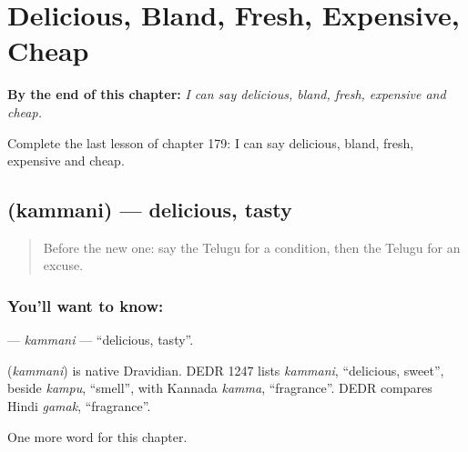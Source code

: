 
\chapter{Delicious, Bland, Fresh, Expensive, Cheap}
\label{ch:te-delicious-bland-fresh-expensive-cheap}

\begin{chapteropening}
\textbf{By the end of this chapter:} \emph{I can say delicious, bland, fresh, expensive and cheap.}

Complete the last lesson of chapter 179: I can say delicious, bland, fresh, expensive and cheap.
\end{chapteropening}

\section[\texorpdfstring{\te{కమ్మని} (kammani)}{కమ్మని (kammani)}]{ (kammani) — delicious, tasty}

\label{lesson:TE-C179-kammani}



\begin{quote}
Before the new one: say the Telugu for a condition, then the Telugu for an excuse.
\end{quote}

\subsection*{You'll want to know: }
\textbf{} — \emph{kammani} — \textquotedblleft{}delicious, tasty\textquotedblright{}.

\begin{cousinweb}
\textbf{} (\emph{kammani}) is native Dravidian. DEDR 1247 lists \emph{kammani}, \textquotedblleft{}delicious, sweet\textquotedblright{}, beside \emph{kampu}, \textquotedblleft{}smell\textquotedblright{}, with Kannada \emph{kamma}, \textquotedblleft{}fragrance\textquotedblright{}. DEDR compares Hindi \emph{gamak}, \textquotedblleft{}fragrance\textquotedblright{}.
\end{cousinweb}

\begin{grammarlens}[title={What you've built}]
One more word for this chapter.
\end{grammarlens}

